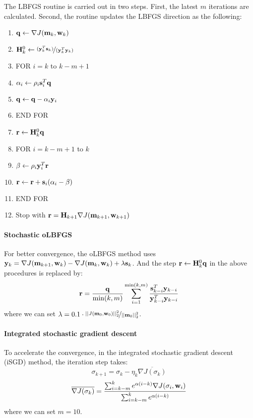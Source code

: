 The LBFGS routine is carried out in two steps.
First, the latest $m$ iterations are calculated.
Second, the routine updates the LBFGS direction as the following:
\begin{enumerate}[\hspace{15mm}1:~]
  \item $\mathbf{q}\leftarrow\nabla J(\mathbf{m}_k,\mathbf{w}_k)$
  \item $\mathbf{H}_k^0\leftarrow\nicefrac{(\mathbf{y}_k^T\mathbf{s}_k)}{(\mathbf{y}_k^T\mathbf{y}_k)}$
  \item FOR $i=k$ to $k-m+1$
  \item \quad\quad $\alpha_i\leftarrow\rho_i\mathbf{s}_i^T\mathbf{q}$
  \item \quad\quad $\mathbf{q}\leftarrow\mathbf{q}-\alpha_i\mathbf{y}_i$
  \item END FOR
  \item $\mathbf{r}\leftarrow\mathbf{H}_k^0\mathbf{q}$
  \item FOR $i=k-m+1$ to $k$
  \item \quad\quad $\beta\leftarrow\rho_i\mathbf{y}_i^T\mathbf{r}$
  \item \quad\quad $\mathbf{r}\leftarrow\mathbf{r}+\mathbf{s}_i(\alpha_i-\beta)$
  \item END FOR
  \item Stop with $\mathbf{r}=\mathbf{H}_{k+1}\nabla J(\mathbf{m}_{k+1},\mathbf{w}_{k+1})$
\end{enumerate}

\paragraph{Stochastic oLBFGS}
For better convergence, the oLBFGS method uses
$\mathbf{y}_k=\nabla J(\mathbf{m}_{k+1},\mathbf{w}_k)-\nabla J(\mathbf{m}_k,\mathbf{w}_k)+\lambda\mathbf{s}_k$.
And the step $\mathbf{r}\leftarrow\mathbf{H}_k^0\mathbf{q}$ in the above procedures is replaced by:
\[ \mathbf{r}=\frac{\mathbf{q}}{\min(k,m)}\sum_{i=1}^{\min(k,m)}\frac{\mathbf{s}_{k-i}^T\mathbf{y}_{k-i}}{\mathbf{y}_{k-i}^T\mathbf{y}_{k-i}} \]
where we can set $\lambda=0.1\cdot\nicefrac{||J(\mathbf{m}_0,\mathbf{w}_0)||_2^2}{||\mathbf{m}_0||_2^2}$.

\paragraph{Integrated stochastic gradient descent}
To accelerate the convergence, in the integrated stochastic gradient descent (iSGD) method,
the iteration step takes:
\[ \sigma_{k+1}=\sigma_k-\eta_k\overline{\nabla J(\sigma_k)} \]
\[ \overline{\nabla J(\sigma_k)}=\frac{\sum_{i=k-m}^ke^{\alpha(i-k)}\nabla J(\sigma_i,\mathbf{w}_i)}{\sum_{i=k-m}^ke^{\alpha(i-k)}} \]
where we can set $m=10$.

